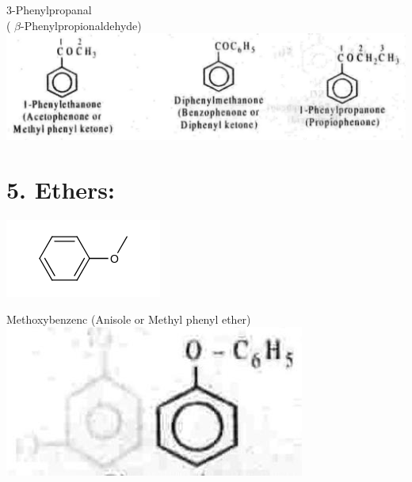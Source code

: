 \documentclass[10pt]{article}
\begin{document}
3-Phenylpropanal\\
( $\beta$-Phenylpropionaldehyde)\\
\includegraphics[max width=\textwidth, center]{2025_01_28_8470952b98110cec3aabg-030(3)}

\section*{5. Ethers:}
\includegraphics{smile-bf35e4345014ff782dd9727c34781b7d73cdd67e}

Methoxybenzenc (Anisole or Methyl phenyl ether)\\
\includegraphics[max width=\textwidth, center]{2025_01_28_8470952b98110cec3aabg-030(2)}
\end{document}
